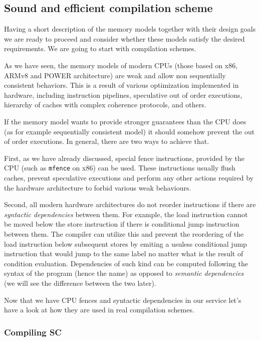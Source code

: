 \documentclass[a4paper,twoside,11pt]{article}
\numberwithin{equation}{section}
\begin{document}
\subsection{Sound and efficient compilation scheme}

Having a short description of the memory models 
together with their design goals we are ready to proceed 
and consider whether these models satisfy the desired requirements.
We are going to start with compilation schemes.

As we have seen, the memory models of modern CPUs 
(those based on x86, ARMv8 and POWER architecture)
are weak and allow non sequentially consistent behaviors.
This is a result of various optimization implemented in hardware,
including instruction pipelines, speculative out of order executions, 
hierarchy of caches with complex coherence protocols, and others.

If the memory model wants to provide stronger guarantees 
than the CPU does (as for example sequentially consistent model)
it should somehow prevent the out of order executions.
In general, there are two ways to achieve that. 

First, as we have already discussed, special fence instructions,
provided by the CPU (such as \texttt{mfence} on x86) can be used.
These instructions usually flush caches, prevent speculative executions
and perform any other actions required by the hardware architecture
to forbid various weak behaviours.

Second, all modern hardware architectures do not reorder instructions 
if there are \emph{syntactic dependencies} between them. 
For example, the load instruction cannot be moved below 
the store instruction if there is conditional jump instruction between them.
The compiler can utilize this and prevent 
the reordering of the load instruction below subsequent stores
by emiting a usuless conditional jump instruction that would jump 
to the same label no matter what is the result of condition evaluation.
Dependencies of such kind can be computed following the 
syntax of the program (hence the name) as opposed 
to \emph{semantic dependencies} 
(we will see the difference between the two later).

Now that we have CPU fences and syntactic dependencies in our service
let's have a look at how they are used in real compilation schemes.

\subsubsection{Compiling SC}
\end{document}
